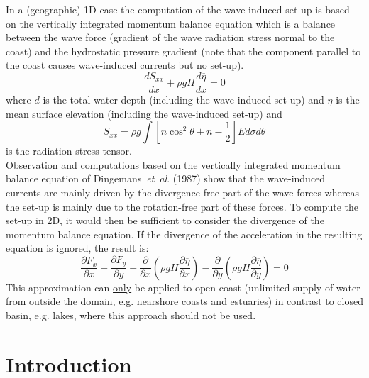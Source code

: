 \documentclass[12pt]{book}
\begin{document}
In a (geographic) 1D case the computation of the wave-induced set-up is based on the vertically integrated
momentum balance equation which is a balance between the wave force (gradient of the wave radiation
stress normal to the coast) and the hydrostatic pressure gradient (note that the component parallel to the
coast causes wave-induced currents but no set-up).
\begin{equation}
  \frac{dS_{xx}}{dx} + \rho g H \frac{d \overline{\eta}}{dx} = 0
  \label{eq3-39}
\end{equation}
where $d$ is the total water depth (including the wave-induced set-up) and $\eta$ is the mean surface elevation
(including the wave-induced set-up) and
\begin{equation}
   S_{xx} = \rho g \int [n \cos^2 \theta + n - \frac{1}{2}]E d \sigma d\theta
  \label{eq3-40}
\end{equation}
is the radiation stress tensor.
\\[2ex]
\noindent
Observation and computations based on the vertically integrated momentum balance equation of
Dingemans~{\it et~al}. (1987) show that the wave-induced currents are mainly driven by the divergence-free
part of the wave forces whereas the set-up is mainly due to the rotation-free part of these forces. To
compute the set-up in 2D, it would then be sufficient to consider the divergence of the momentum balance
equation. If the divergence of the acceleration in the resulting equation is ignored, the result is:
\begin{equation}
  \frac{\partial F_x}{\partial x} + \frac{\partial F_y}{\partial y} -
  \frac{\partial}{\partial x} (\rho g H \frac{\partial \overline{\eta}}{\partial x}) -
  \frac{\partial}{\partial y} (\rho g H \frac{\partial \overline{\eta}}{\partial y}) = 0
  \label{eq3-41}
\end{equation}
This approximation can \underline{only} be applied to open coast (unlimited supply of water from outside
the domain, e.g. nearshore coasts and estuaries) in contrast to closed basin, e.g. lakes, where this approach
should not be used.

 \label{ch:numerics}

\section{Introduction} \label{sec:intnum}
\end{document}
